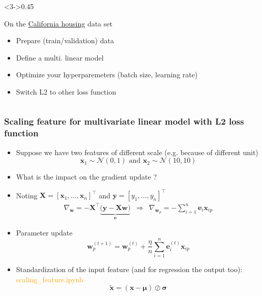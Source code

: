 \documentclass[pressentation,10pt,aspectratio=169,xcolor=table, colorlinks=true]{beamer}
\begin{document}
\begin{frame}[fragile]
\begin{columns}
    \begin{column}<3->{0.45\linewidth}
      \begin{work}
        On the \href{https://scikit-learn.org/stable/modules/generated/sklearn.datasets.fetch_california_housing.html#sklearn.datasets.fetch_california_housing}{California housing} data set
        \begin{itemize}
        \item Prepare (train/validation) data
        \item Define a multi. linear model
        \item Optimize your hyperparemeters (batch size, learning rate)
        \item Switch L2 to other loss function
        \end{itemize}
      \end{work}
    \end{column}
  \end{columns}
  
\end{frame}

\begin{frame}[label={scale_frame}]
  \frametitle{Scaling feature for multivariate linear model with L2 loss function}
  \begin{itemize}
  \item Suppose we have two features of different scale (e.g. because of different unit)
    \[\mathbf{x}_1 \sim \mathcal{N}(0,1) \text{ and } \mathbf{x}_2 \sim \mathcal{N}(10, 10)\]
  \item What is the impact on the gradient update ?
  \item <2-> Noting \(\mathbf{X} = [\mathbf{x}_1, \ldots, \mathbf{x}_n]^\top\) and \(\mathbf{y} = [y_1, \ldots, y_n]^\top\)
    \begin{align*}
      \nabla_{\mathbf{w}} = -\mathbf{X}^\top\underbrace{\big(\mathbf{y} - \mathbf{X}\mathbf{w}\big)}_{\mathbf{e}}   &\Rightarrow& \nabla_{\mathbf{w}_p}= -\sum_{i=1}^n\mathbf{e}_i\mathbf{x}_{ip}
    \end{align*}
  \item <2-> Parameter update
    \[\mathbf{w}_p^{(t+1)} = \mathbf{w}_p^{(t)} + \frac{\eta}{n}\sum_{i=1}^n\mathbf{e}_i^{(t)}\mathbf{x}_{ip}\]

    
  \item <3> Standardization of the input feature (and for regression the output too): \textcolor{orange}{scaling\_feature.ipynb}
    \[\tilde{\mathbf{x}} = (\mathbf{x}-\boldsymbol{\mu})\oslash\boldsymbol{\sigma}\]
  \end{itemize}
  
\end{frame}
\end{document}
